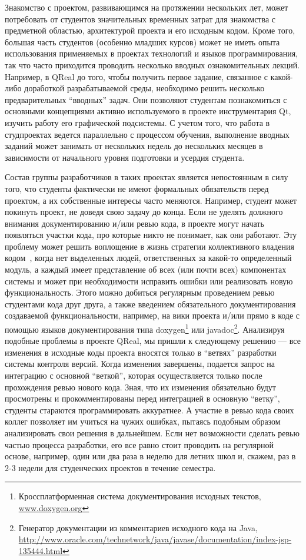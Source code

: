 \documentclass[a4paper]{article}
\begin{document}
Знакомство с проектом, развивающимся на протяжении нескольких лет, может потребовать от студентов значительных временных затрат для знакомства с предметной областью, архитектурой проекта и его исходным кодом. Кроме того, большая часть студентов (особенно младших курсов) может не иметь опыта использования применяемых в проектах технологий и языков программирования, так что часто приходится проводить несколько вводных ознакомительных лекций. Например, в QReal до того, чтобы получить первое задание, связанное с какой-либо доработкой разрабатываемой среды, необходимо решить несколько предварительных ``вводных'' задач. Они позволяют студентам познакомиться с основными концепциями активно используемого в проекте инструментария Qt, изучить работу его графической подсистемы. С учетом того, что работа в студпроектах ведется параллельно с процессом обучения, выполнение вводных заданий может занимать от нескольких недель до нескольких месяцев в зависимости от начального уровня подготовки и усердия студента.

Состав группы разработчиков в таких проектах является непостоянным в силу того, что студенты фактически не имеют формальных обязательств перед проектом, а их собственные интересы часто меняются. Например, студент может покинуть проект, не доведя свою задачу до конца. Если не уделять должного внимания документированию и/или ревью кода, в проекте могут начать появляться участки кода, про которые никто не понимает, как они работают. Эту проблему может решить воплощение в жизнь стратегии коллективного владения кодом~\cite{collectiveOwnership}, когда нет выделенных людей, ответственных за какой-то определенный модуль, а каждый имеет представление об всех (или почти всех) компонентах системы и может при необходимости исправить ошибки или реализовать новую функциональность. Этого можно добиться регулярным проведением ревью студентами кода друг друга, а также введением обязательного документирования создаваемой функциональности, например, на вики проекта и/или прямо в коде с помощью языков документирования типа doxygen\footnote{Кроссплатформенная система документирования исходных текстов, \url{www.doxygen.org}} или javadoc\footnote{Генератор документации из комментариев исходного кода на Java, \url{http://www.oracle.com/technetwork/java/javase/documentation/index-jsp-135444.html}}. Анализируя подобные проблемы в проекте QReal, мы пришли к следующему решению --- все изменения в исходные коды проекта вносятся только в ``ветвях'' разработки системы контроля версий. Когда изменения завершены, подается запрос на интеграцию с основной ``веткой'', которая осуществляется только после прохождения ревью нового кода. Зная, что их изменения обязательно будут просмотрены и прокомментированы перед интеграцией в основную ``ветку'', студенты стараются программировать аккуратнее. А участие в ревью кода своих коллег позволяет им учиться на чужих ошибках, пытаясь подобным образом анализировать свои решения в дальнейшем. Если нет возможности сделать ревью частью процесса разработки, его все равно стоит проводить на регулярной основе, например, один или два раза в неделю для летних школ и, скажем, раз в 2-3 недели для студенческих проектов в течение семестра.
\end{document}
